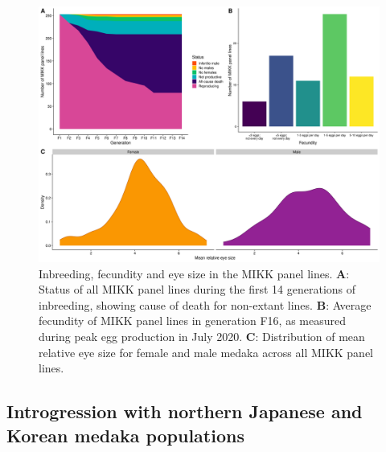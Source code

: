 \documentclass[
  9pt,
]{book}
\begin{document}
\begin{figure}
\includegraphics[width=1\linewidth]{figs/mikk_genome/20211213_final_figure} \caption{Inbreeding, fecundity and eye size in the MIKK panel lines. \textbf{A}: Status of all MIKK panel lines during the first 14 generations of inbreeding, showing cause of death for non-extant lines. \textbf{B}: Average fecundity of MIKK panel lines in generation F16, as measured during peak egg production in July 2020. \textbf{C}: Distribution of mean relative eye size for female and male medaka across all MIKK panel lines.}\label{fig:InbreedingFigure}
\end{figure}

\hypertarget{introgression-sec}{%
\subsection{Introgression with northern Japanese and Korean medaka populations}\label{introgression-sec}}
\end{document}
